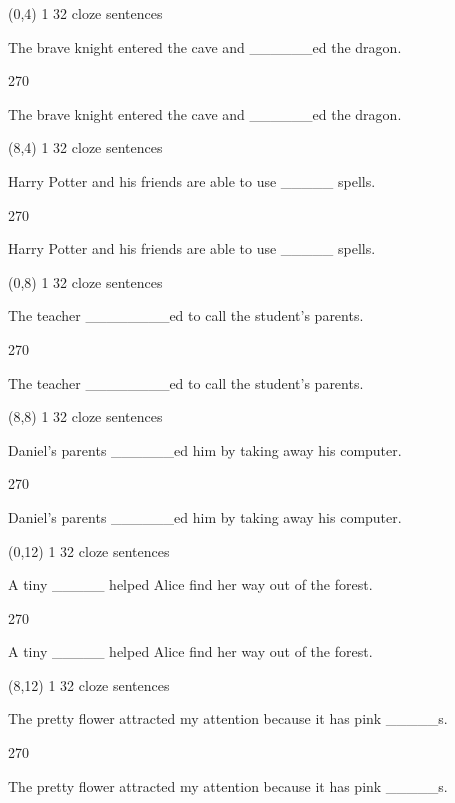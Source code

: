 \documentclass[a4paper]{article}
\newenvironment{itemize*}%
{\begin{itemize}%
 \setlength{\itemsep}{0.5cm}%
 \setlength{\parsep}{0pt}%
 \setlength{\parskip}{0pt}}%
{\end{itemize}}
\newcommand{\mycard}[3]{%
	\small #1 #2
	\par
	\parbox[t][6.8cm][c]{9.5cm}{%
	\par
	\myleft{#3}
	\par
	\myright{#3}
	}
}
\newcommand{\myleft}[1]{%
	\begin{sideways}
	\hspace*{-0.9cm}
		\parbox[t][2.7cm][t]{6.5cm}{%
		\large #1
		}
	\end{sideways}
}
\newcommand{\myright}[1]{%
	\hspace*{6.5cm}
	\begin{turn}{270}
	\hspace*{-7.1cm}
		\parbox[t][2.7cm][t]{6.5cm}{%
		\large #1
		}
	\end{turn}
}
\begin{document}
\begin{textblock}{8}(0,4)
\mycard{1}{32 cloze sentences}{
\begin{itemize*}
\item The brave knight entered the cave and \_\_\_\_\_\_ed the dragon.
\end{itemize*}
}
\end{textblock}

\begin{textblock}{8}(8,4)
\mycard{1}{32 cloze sentences}{
\begin{itemize*}
\item Harry Potter and his friends are able to use \_\_\_\_\_ spells.
\end{itemize*}
}
\end{textblock}

\begin{textblock}{8}(0,8)
\mycard{1}{32 cloze sentences}{
\begin{itemize*}
\item The teacher \_\_\_\_\_\_\_\_ed to call the student's parents.
\end{itemize*}
}
\end{textblock}

\begin{textblock}{8}(8,8)
\mycard{1}{32 cloze sentences}{
\begin{itemize*}
\item Daniel's parents \_\_\_\_\_\_ed him by taking away his computer.
\end{itemize*}
}
\end{textblock}

\begin{textblock}{8}(0,12)
\mycard{1}{32 cloze sentences}{
\begin{itemize*}
\item A tiny \_\_\_\_\_ helped Alice find her way out of the forest.
\end{itemize*}
}
\end{textblock}

\begin{textblock}{8}(8,12)
\mycard{1}{32 cloze sentences}{
\begin{itemize*}
\item The pretty flower attracted my attention because it has pink \_\_\_\_\_s.
\end{itemize*}
}
\end{textblock}
\end{document}
